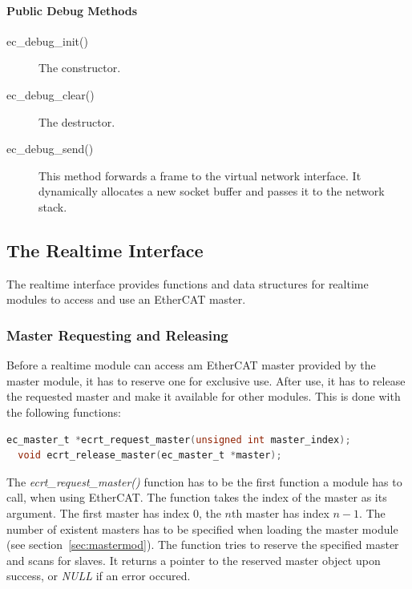 \documentclass[a4paper,12pt,BCOR6mm,bibtotoc,idxtotoc]{scrbook}
\begin{document}
\paragraph{Public Debug Methods}

\begin{description}
\item[ec\_debug\_init()] The constructor.
\item[ec\_debug\_clear()] The destructor.
\item[ec\_debug\_send()] This method forwards a frame to the virtual
  network interface. It dynamically allocates a new socket buffer and
  passes it to the network stack.
\end{description}


\subsection{The Realtime Interface}
\label{sec:ecrt}

The realtime interface provides functions and data structures for
realtime modules to access and use an EtherCAT master.

\subsubsection{Master Requesting and Releasing}

Before a realtime module can access am EtherCAT master provided by the
master module, it has to reserve one for exclusive use. After use, it
has to release the requested master and make it available for other
modules. This is done with the following functions:

\begin{lstlisting}[language=C]
  ec_master_t *ecrt_request_master(unsigned int master_index);
  void ecrt_release_master(ec_master_t *master);
\end{lstlisting}

The \textit{ecrt\_request\_master()} function has to be the first
function a module has to call, when using EtherCAT. The function takes
the index of the master as its argument. The first master has index 0,
the $n$th master has index $n - 1$. The number of existent masters has
to be specified when loading the master module (see
section~\ref{sec:mastermod}). The function tries to reserve the
specified master and scans for slaves. It returns a pointer to the
reserved master object upon success, or \textit{NULL} if an error
occured.
\end{document}
